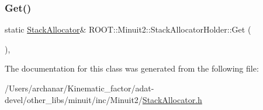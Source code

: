 \mbox{\label{classROOT_1_1Minuit2_1_1StackAllocatorHolder_ae380b3ed5065e114b12ac61207542466}} 
\subsubsection{\texorpdfstring{Get()}{Get()}\hspace{0.1cm}{\footnotesize\ttfamily [3/3]}}
{\footnotesize\ttfamily static \mbox{\hyperlink{classROOT_1_1Minuit2_1_1StackAllocator}{Stack\+Allocator}}\& R\+O\+O\+T\+::\+Minuit2\+::\+Stack\+Allocator\+Holder\+::\+Get (\begin{DoxyParamCaption}{ }\end{DoxyParamCaption})\hspace{0.3cm}{\ttfamily [inline]}, {\ttfamily [static]}}



The documentation for this class was generated from the following file\+:\begin{DoxyCompactItemize}
\item 
/\+Users/archanar/\+Kinematic\+\_\+factor/adat-\/devel/other\+\_\+libs/minuit/inc/\+Minuit2/\mbox{\hyperlink{adat-devel_2other__libs_2minuit_2inc_2Minuit2_2StackAllocator_8h}{Stack\+Allocator.\+h}}\end{DoxyCompactItemize}

